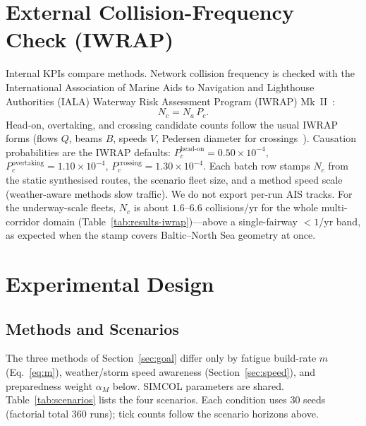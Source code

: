 \documentclass[cameraready]{Interspeech}
\begin{document}
\section{External Collision-Frequency Check (IWRAP)}
\label{sec:iwrap}

Internal KPIs compare methods. Network collision frequency is checked with the International Association of Marine Aids to Navigation and Lighthouse Authorities (IALA) Waterway Risk Assessment Program (IWRAP) Mk~II~\cite{friishansen2008iwrap,lusic2015}:
\begin{equation*}
  N_c = N_a\,P_c.
\end{equation*}
Head-on, overtaking, and crossing candidate counts follow the usual IWRAP forms (flows $Q$, beams $B$, speeds $V$, Pedersen diameter for crossings~\cite{friishansen2008iwrap,pedersen1995}). Causation probabilities are the IWRAP defaults: $P_c^{\text{head-on}} = 0.50\times10^{-4}$, $P_c^{\text{overtaking}} = 1.10\times10^{-4}$, $P_c^{\text{crossing}} = 1.30\times10^{-4}$. Each batch row stamps $N_c$ from the static synthesised routes, the scenario fleet size, and a method speed scale (weather-aware methods slow traffic). We do not export per-run AIS tracks. For the underway-scale fleets, $N_c$ is about $1.6$--$6.6$ collisions/yr for the whole multi-corridor domain (Table~\ref{tab:results-iwrap})---above a single-fairway ${<}1$/yr band, as expected when the stamp covers Baltic--North Sea geometry at once.

\FloatBarrier

\section{Experimental Design}
\label{sec:experiment}

\subsection{Methods and Scenarios}

The three methods of Section~\ref{sec:goal} differ only by fatigue build-rate $m$ (Eq.~\ref{eq:m}), weather/storm speed awareness (Section~\ref{sec:speed}), and preparedness weight $\alpha_M$ below. SIMCOL parameters are shared. Table~\ref{tab:scenarios} lists the four scenarios. Each condition uses $30$ seeds (factorial total $360$ runs); tick counts follow the scenario horizons above.
\end{document}

